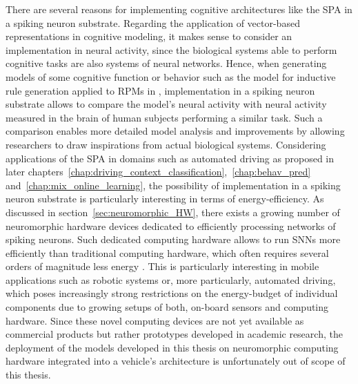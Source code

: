There are several reasons for implementing cognitive architectures like the \ac{SPA} in a spiking neuron substrate.
Regarding the application of vector-based representations in cognitive modeling, it makes sense to consider an implementation in neural activity, since the biological systems able to perform cognitive tasks are also systems of neural networks.
Hence, when generating models of some cognitive function or behavior such as the model for inductive rule generation applied to \acp{RPM} in \textcite{Rasmussen2011}, implementation in a spiking neuron substrate allows to compare the model's neural activity with neural activity measured in the brain of human subjects performing a similar task.
Such a comparison enables more detailed model analysis and improvements by allowing researchers to draw inspirations from actual biological systems.
Considering applications of the \ac{SPA} in domains such as automated driving as proposed in later chapters~\ref{chap:driving_context_classification},~\ref{chap:behav_pred} and~\ref{chap:mix_online_learning}, the possibility of implementation in a spiking neuron substrate is particularly interesting in terms of energy-efficiency.
As discussed in section~\ref{sec:neuromorphic_HW}, there exists a growing number of neuromorphic hardware devices dedicated to efficiently processing networks of spiking neurons.
Such dedicated computing hardware allows to run \acp{SNN} more efficiently than traditional computing hardware, which often requires several orders of magnitude less energy \parencite{Hunsberger2016}.
This is particularly interesting in mobile applications such as robotic systems or, more particularly, automated driving, which poses increasingly strong restrictions on the energy-budget of individual components due to growing setups of both, on-board sensors and computing hardware.
Since these novel computing devices are not yet available as commercial products but rather prototypes developed in academic research, the deployment of the models developed in this thesis on neuromorphic computing hardware integrated into a vehicle's architecture is unfortunately out of scope of this thesis. 

